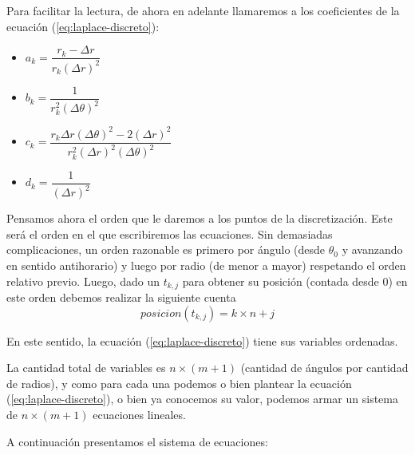 Para facilitar la lectura, de ahora en adelante llamaremos a los coeficientes de la ecuación (\ref{eq:laplace-discreto}): 
\begin{itemize}
\item $a_k = \dfrac{r_k - \Delta r}{r_k (\Delta r)^2}$ 
\item $b_k = \dfrac{1}{r_k^2(\Delta \theta)^2}$ 
\item $c_k = \dfrac{r_k \Delta r (\Delta \theta)^2 - 2(\Delta r)^2}{r_k^2 (\Delta r)^2 (\Delta \theta)^2}$ 
\item $d_k = \dfrac{1}{(\Delta r)^2}$
\end{itemize}

Pensamos ahora el orden que le daremos a los puntos de la discretización. Este será el orden en el que escribiremos las ecuaciones. Sin demasiadas complicaciones, un orden razonable es primero por ángulo (desde $\theta_0$ y avanzando en sentido antihorario) y luego por radio (de menor a mayor) respetando el orden relativo previo. Luego, dado un $t_{k,j}$ para obtener su posición (contada desde 0) en este orden debemos realizar la siguiente cuenta
\begin{equation}
\label{eq:posicion}
	posicion(t_{k,j}) = k\times n + j
\end{equation}

En este sentido, la ecuación (\ref{eq:laplace-discreto}) tiene sus variables ordenadas. 

La cantidad total de variables es $n\times(m+1)$ (cantidad de ángulos por cantidad de radios), y como para cada una podemos o bien plantear la ecuación (\ref{eq:laplace-discreto}), o bien ya conocemos su valor, podemos armar un sistema de $n\times(m+1)$ ecuaciones lineales.

A continuación presentamos el sistema de ecuaciones: 

